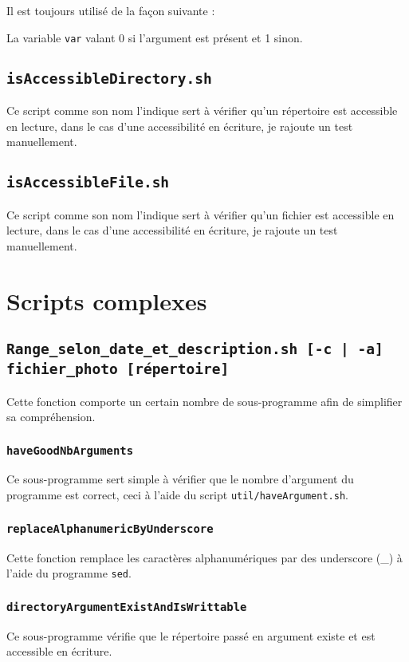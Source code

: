 \documentclass[a4paper, 11pt]{article}
\begin{document}
	Il est toujours utilisé de la façon suivante : 
	
	La variable \texttt{var} valant 0 si l'argument est présent et 1 sinon.
	\subsection{\texttt{isAccessibleDirectory.sh}}
	Ce script comme son nom l'indique sert à vérifier qu'un répertoire est accessible en lecture, dans le cas d'une accessibilité en écriture, je rajoute un
	test manuellement.
	\subsection{\texttt{isAccessibleFile.sh}}
	Ce script comme son nom l'indique sert à vérifier qu'un fichier est accessible en lecture, dans le cas d'une accessibilité en écriture, je rajoute un
	test manuellement.
	\section{Scripts complexes}
	\subsection{\texttt{Range\_selon\_date\_et\_description.sh [-c | -a] fichier\_photo [répertoire]}}
	Cette fonction comporte un certain nombre de sous-programme afin de simplifier sa compréhension.
	\subsubsection{\texttt{haveGoodNbArguments}}
	Ce sous-programme sert simple à vérifier que le nombre d'argument du programme est correct, ceci à l'aide du script \texttt{util/haveArgument.sh}.
	\subsubsection{\texttt{replaceAlphanumericByUnderscore}}
	Cette fonction remplace les caractères alphanumériques par des underscore (\_) à l'aide du programme \texttt{sed}.
	\subsubsection{\texttt{directoryArgumentExistAndIsWrittable}}
	Ce sous-programme vérifie que le répertoire passé en argument existe et est accessible en écriture.
\end{document}
